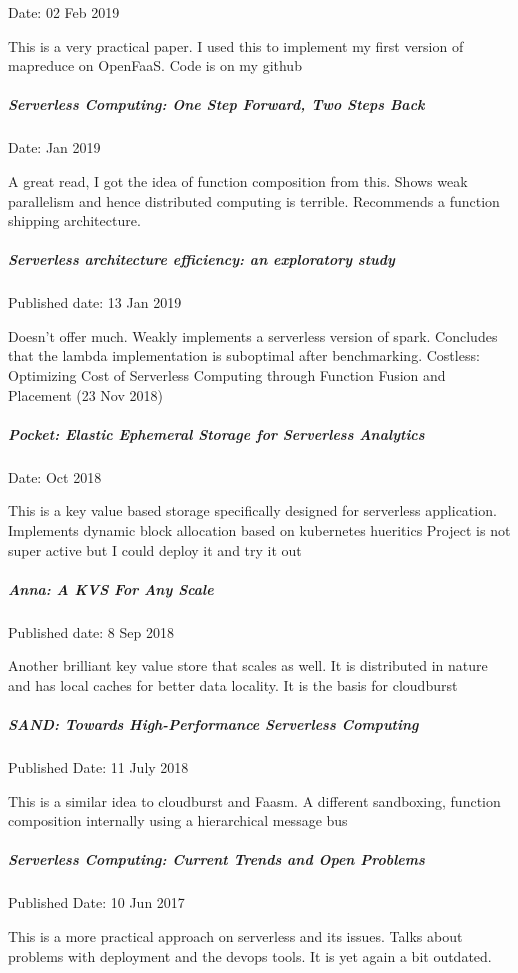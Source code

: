 \documentclass[12pt,titlepage]{article}
\begin{document}
Date: 02 Feb 2019

This is a very practical paper. I used this to implement my first version of mapreduce on OpenFaaS. Code is on my github

\subparagraph{Serverless Computing: One Step Forward, Two Steps Back}
\label{sec:orgc61e94c}

Date: Jan 2019

A great read, I got the idea of function composition from this.
Shows weak parallelism and hence distributed computing is terrible.
Recommends a function shipping architecture.

\subparagraph{Serverless architecture efficiency: an exploratory study}
\label{sec:org67690ad}

Published date: 13 Jan 2019

Doesn’t offer much. Weakly implements a serverless version of spark.
Concludes that the lambda implementation is suboptimal after benchmarking.
Costless: Optimizing Cost of Serverless Computing through Function Fusion and Placement (23 Nov 2018)

\subparagraph{Pocket: Elastic Ephemeral Storage for Serverless Analytics}
\label{sec:orga675c43}

Date: Oct 2018

This is a key value based storage specifically designed for serverless application. 
Implements dynamic block allocation based on kubernetes hueritics 
Project is not super active but I could deploy it and try it out

\subparagraph{Anna: A KVS For Any Scale}
\label{sec:orgeb9f592}

Published date: 8 Sep 2018

Another brilliant key value store that scales as well. It is distributed in nature and has local caches for better data locality. It is the basis for cloudburst

\subparagraph{SAND: Towards High-Performance Serverless Computing}
\label{sec:orgf16bde7}

Published Date: 11 July 2018

This is a similar idea to cloudburst and Faasm. A different sandboxing, function composition internally using a hierarchical message bus

\subparagraph{Serverless Computing: Current Trends and Open Problems}
\label{sec:org940e0f4}

Published Date: 10 Jun 2017

This is a more practical approach on serverless and its issues.
Talks about problems with deployment and the devops tools. 
It is yet again a bit outdated. 
\end{document}
